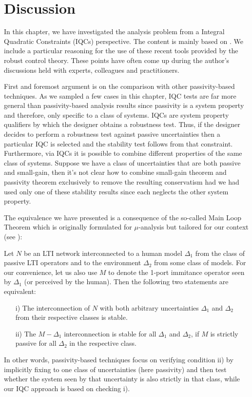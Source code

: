 \section{Discussion}



In this chapter, we have investigated the analysis problem from a Integral Quad\-ratic Constraints (IQCs) perspective. 
The content is mainly based on \cite{polattro}. We include a particular reasoning for the use of these recent tools 
provided by the robust control theory. These points have often come up during the author's discussions held with 
experts, colleagues and practitioners.

First and foremost argument is on the comparison with other passivity-based techniques. As we sampled a few cases
in this chapter, IQC tests are far more general than passivity-based analysis results since passivity is a 
system property and therefore, only specific to a class of systems. IQCs are system property qualifiers by which 
the designer obtains a robustness test. Thus, if the designer decides to perform a 
robustness test against passive uncertainties then a particular IQC is selected and the stability test follows
from that constraint. Furthermore, via IQCs it is possible to combine different properties of the same class 
of systems. Suppose we have a class of uncertainties that are both passive and small-gain, then it's not clear
how to combine small-gain theorem and passivity theorem exclusively to remove the resulting conservatism had we 
had used only one of these stability results since each neglects the other system property. 

The equivalence we have presented is a consequence of the so-called Main Loop Theorem which is originally formulated 
for $\mu$-analysis but tailored for our context 
(see \cite[Thm. 11.7]{zhoubook}): 
\begin{thm}
Let $N$ be an LTI network interconnected to a human model $\Delta_1$ from the 
class of passive LTI operators and to the environment $\Delta_2$ from some class of models. For our convenience, 
let us also use $M$ to denote the 1-port immitance operator seen by $\Delta_1$ (or perceived by the human). 
Then the following two statements are equivalent:
\begin{enumerate}
	\item[i)] The interconnection of $N$ with both arbitrary uncertainties $\Delta_1$ and $\Delta_2$ from their 
    respective classes is stable.
	\item[ii)] The $M-\Delta_1$ interconnection is stable for all $\Delta_1$ and $\Delta_2$, if $M$ is strictly passive for all $\Delta_2$ in the respective class.
\end{enumerate}
\end{thm}
In other words, passivity-based techniques focus on verifying condition ii) by implicitly fixing to one class of 
uncertainties (here passivity) and then test whether the system seen by that uncertainty is also strictly in that
class, while our IQC approach is based on checking i).


